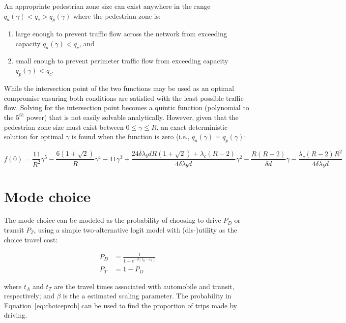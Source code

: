 \documentclass{article}
\begin{document}
An appropriate pedestrian zone size can exist anywhere in the range $q_a(\gamma) < q_c > q_p(\gamma)$ where the pedestrian zone is:
\begin{enumerate}[label=(\alph*)]
    \item large enough to prevent traffic flow across the network from exceeding capacity $q_a(\gamma) < q_c$, and 
    \item small enough to prevent perimeter traffic flow from exceeding capacity $q_p(\gamma) < q_c$. 
\end{enumerate}

While the intersection point of the two functions may be used as an optimal compromise ensuring both conditions are satisfied with the least possible traffic flow. Solving for the intersection point becomes a quintic function (polynomial to the $5^{th}$ power) that is not easily solvable analytically. However, given that the pedestrian zone size must exist between $0 \leq \gamma \leq R$, an exact deterministic solution for optimal $\gamma$ is found when the function is zero (i.e., $q_a(\gamma) = q_p(\gamma)$:

\begin{equation}
f(0) = \frac{11}{R^2} \gamma^5 - \frac{6(1+\sqrt{2})}{R}\gamma^4 - 11\gamma^3 + \frac{24\delta\lambda_b d R(1+\sqrt{2}) + \lambda_{c}(R-2)}{4\delta\lambda_{b}d}\gamma^{2} - \frac{R(R-2)}{\delta d}\gamma - \frac{\lambda_{c}(R-2)R^{2}}{4\delta\lambda_{b}d}
\end{equation}


\section{Mode choice}

The mode choice can be modeled as the probability of choosing to drive $P_D$ or transit $P_T$, using a simple two-alternative logit model with (dis-)utility as the choice travel cost:

\begin{subequations}
    \label{eq:choiceprob}
    \begin{align}
        P_D & = \frac{1}{1+e^{-\beta (t_D-t_T)}}\\
        P_T & = 1 - P_D
    \end{align}
\end{subequations}

\noindent where $t_A$ and $t_T$ are the travel times associated with automobile and transit, respectively; and $\beta$ is the a estimated scaling parameter. The probability in Equation~\eqref{eq:choiceprob} can be used to find the proportion of trips made by driving.
\end{document}
